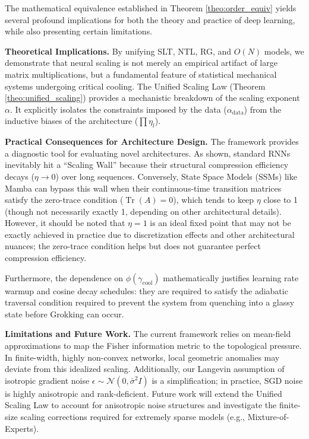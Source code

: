 \documentclass[11pt, a4paper]{article}
\theoremstyle{plain}
\DeclareMathOperator{\Tr}{Tr}
\begin{document}
The mathematical equivalence established in Theorem \ref{theo:order_equiv} yields several profound implications for both the theory and practice of deep learning, while also presenting certain limitations.

\textbf{Theoretical Implications.} By unifying SLT, NTL, RG, and $O(N)$ models, we demonstrate that neural scaling is not merely an empirical artifact of large matrix multiplications, but a fundamental feature of statistical mechanical systems undergoing critical cooling. The Unified Scaling Law (Theorem \ref{theo:unified_scaling}) provides a mechanistic breakdown of the scaling exponent $\alpha$. It explicitly isolates the constraints imposed by the data ($\alpha_{\text{data}}$) from the inductive biases of the architecture ($\prod \eta_l$).

\textbf{Practical Consequences for Architecture Design.} The framework provides a diagnostic tool for evaluating novel architectures. As shown, standard RNNs inevitably hit a ``Scaling Wall'' because their structural compression efficiency decays ($\eta \to 0$) over long sequences. Conversely, State Space Models (SSMs) like Mamba \citep{gu2023mamba} can bypass this wall when their continuous-time transition matrices satisfy the zero-trace condition ($\Tr(A)=0$), which tends to keep $\eta$ close to 1 (though not necessarily exactly 1, depending on other architectural details). However, it should be noted that $\eta=1$ is an ideal fixed point that may not be exactly achieved in practice due to discretization effects and other architectural nuances; the zero-trace condition helps but does not guarantee perfect compression efficiency.

Furthermore, the dependence on $\phi(\gamma_{\text{cool}})$ mathematically justifies learning rate warmup and cosine decay schedules: they are required to satisfy the adiabatic traversal condition required to prevent the system from quenching into a glassy state before Grokking can occur.

\textbf{Limitations and Future Work.} The current framework relies on mean-field approximations to map the Fisher information metric to the topological pressure. In finite-width, highly non-convex networks, local geometric anomalies may deviate from this idealized scaling. Additionally, our Langevin assumption of isotropic gradient noise $\epsilon \sim \mathcal{N}(0, \bar{\sigma}^2 I)$ is a simplification; in practice, SGD noise is highly anisotropic and rank-deficient. Future work will extend the Unified Scaling Law to account for anisotropic noise structures and investigate the finite-size scaling corrections required for extremely sparse models (e.g., Mixture-of-Experts).
\end{document}
